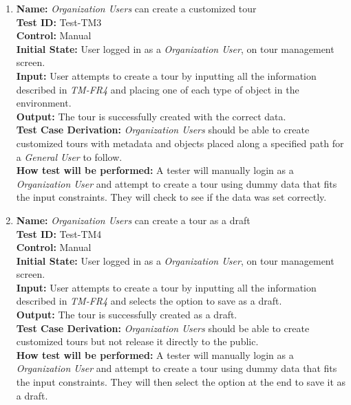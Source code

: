 \documentclass[12pt, titlepage]{article}
\begin{document}
\begin{enumerate}
  \item
        \textbf{Name:} \textit{Organization Users} can create a customized tour \label{itm:Test-TM3} \\
        \textbf{Test ID:} Test-TM3 \\
        \textbf{Control:} Manual \\
        \textbf{Initial State:} User logged in as a \textit{Organization User}, on tour management screen. \\
        \textbf{Input:} User attempts to create a tour by inputting all the information described in \textit{TM-FR4} and placing one of each type of object in the environment. \\
        \textbf{Output:} The tour is successfully created with the correct data. \\
        \textbf{Test Case Derivation:} \textit{Organization Users} should be able to create customized tours with metadata and objects placed along a specified path for a \textit{General User} to follow. \\
        \textbf{How test will be performed:} A tester will manually login as a \textit{Organization User} and attempt to create a tour using dummy data that fits the input constraints. They will check to see if the data was set correctly.

  \item
        \textbf{Name:} \textit{Organization Users} can create a tour as a draft \label{itm:Test-TM4} \\
        \textbf{Test ID:} Test-TM4 \\
        \textbf{Control:} Manual \\
        \textbf{Initial State:} User logged in as a \textit{Organization User}, on tour management screen. \\
        \textbf{Input:} User attempts to create a tour by inputting all the information described in \textit{TM-FR4} and selects the option to save as a draft. \\
        \textbf{Output:} The tour is successfully created as a draft. \\
        \textbf{Test Case Derivation:} \textit{Organization Users} should be able to create customized tours but not release it directly to the public. \\
        \textbf{How test will be performed:} A tester will manually login as a \textit{Organization User} and attempt to create a tour using dummy data that fits the input constraints. They will then select the option at the end to save it as a draft.


\end{enumerate}
\end{document}
